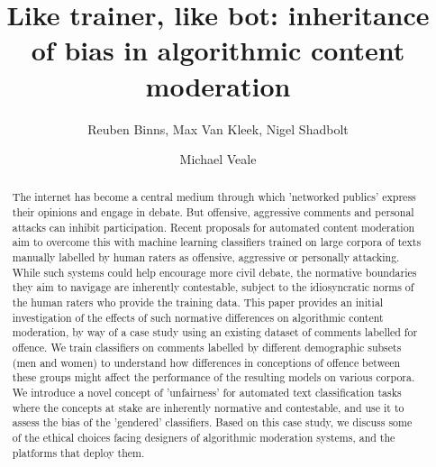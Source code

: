 \documentclass[runningheads,a4paper]{llncs}
\begin{document}
\title{Like trainer, like bot: inheritance of bias in algorithmic content moderation}


\author{Reuben Binns, Max Van Kleek, Nigel Shadbolt \and Michael Veale }

\fi
			
\maketitle

\begin{abstract}
The internet has become a central medium through which 'networked publics' express their opinions and engage in debate. But offensive, aggressive comments and personal attacks can inhibit participation. Recent proposals for automated content moderation aim to overcome this with machine learning classifiers trained on large corpora of texts manually labelled by human raters as offensive, aggressive or personally attacking. While such systems could help encourage more civil debate, the normative boundaries they aim to navigage are inherently contestable, subject to the idiosyncratic norms of the human raters who provide the training data. This paper provides an initial investigation of the effects of such normative differences on algorithmic content moderation, by way of a case study using an existing dataset of comments labelled for offence. We train classifiers on comments labelled by different demographic subsets (men and women) to understand how differences in conceptions of offence between these groups might affect the performance of the resulting models on various corpora. We introduce a novel concept of 'unfairness' for automated text classification tasks where the concepts at stake are inherently normative and contestable, and use it to assess the bias of the 'gendered' classifiers. Based on this case study, we discuss some of the ethical choices facing designers of algorithmic moderation systems, and the platforms that deploy them.
\end{abstract}
\end{document}
